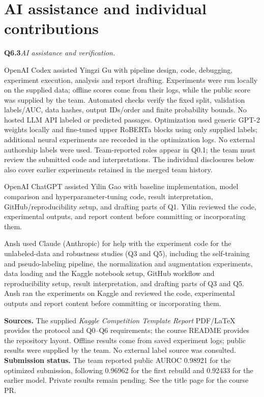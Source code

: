 \documentclass[10pt,letterpaper]{article}
\newcommand{\q}[2]{\needspace{4\baselineskip}\par\addvspace{7pt}\textbf{#1}\quad\textit{#2}\par\nobreak}
\begin{document}
\section*{AI assistance and individual contributions}
\q{Q6.3}{AI assistance and verification.}
OpenAI Codex assisted Yingzi Gu with pipeline design, code, debugging, experiment execution, analysis and report drafting.
Experiments were run locally on the supplied data; offline scores come from their logs, while the public score was supplied by the team.
Automated checks verify the fixed split, validation labels/AUC, data hashes, output IDs/order and finite probability bounds.
No hosted LLM API labeled or predicted passages. Optimization used generic GPT-2 weights locally and fine-tuned upper RoBERTa blocks using only supplied labels; additional neural experiments are recorded in the optimization logs. No external authorship labels were used.
Team-reported roles appear in Q0.1; the team must review the submitted code and interpretations.
The individual disclosures below also cover earlier experiments retained in the merged team history.

OpenAI ChatGPT assisted Yilin Gao with baseline implementation, model comparison and hyperparameter-tuning code, result interpretation, GitHub/reproducibility setup, and drafting parts of Q1. Yilin reviewed the code, experimental outputs, and report content before committing or incorporating them.

Ansh used Claude (Anthropic) for help with the experiment code for the unlabeled-data and robustness studies (Q3 and Q5), including the self-training and pseudo-labeling pipeline, the normalization and augmentation experiments, data loading and the Kaggle notebook setup, GitHub workflow and reproducibility setup, result interpretation, and drafting parts of Q3 and Q5. Ansh ran the experiments on Kaggle and reviewed the code, experimental outputs and report content before committing or incorporating them.

\vspace{.1in}
\textbf{Sources.} The supplied \emph{Kaggle Competition Template Report} PDF/LaTeX provides the protocol and Q0--Q6 requirements; the course README provides the repository layout. Offline results come from saved experiment logs; public results were supplied by the team. No external label source was consulted.
\vspace{.1in}
\textbf{Submission status.}
The team reported public AUROC 0.98921 for the optimized submission, following 0.96962 for the first rebuild and 0.92433 for the earlier model. Private results remain pending. See the title page for the course PR.
\end{document}
